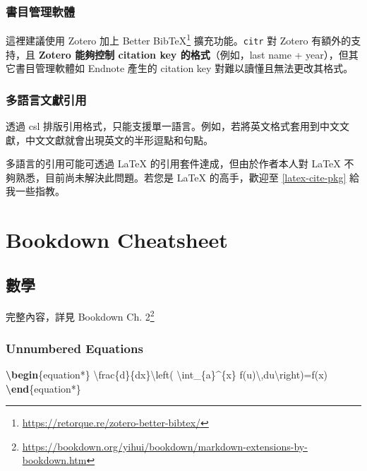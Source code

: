 \documentclass[oneside]{book}
\newenvironment{Shaded}{\begin{snugshade}}{\end{snugshade}}
\newcommand{\KeywordTok}[1]{\textcolor[rgb]{0.13,0.29,0.53}{\textbf{#1}}}
\newcommand{\SpecialCharTok}[1]{\textcolor[rgb]{0.00,0.00,0.00}{#1}}
\newcommand{\SpecialStringTok}[1]{\textcolor[rgb]{0.31,0.60,0.02}{#1}}
\newcommand{\ExtensionTok}[1]{#1}
\newcommand{\NormalTok}[1]{#1}
\renewcommand{\href}[2]{#2\footnote{\url{#1}}}
\theoremstyle{definition}
\theoremstyle{definition}
\theoremstyle{definition}
\theoremstyle{remark}
\begin{document}
\subsection{書目管理軟體}\label{ref-manager}

這裡建議使用 Zotero 加上
\href{https://retorque.re/zotero-better-bibtex/}{Better BibTeX}
擴充功能。\texttt{citr} 對 Zotero 有額外的支持，且 \textbf{Zotero
能夠控制 citation key 的格式}（例如，last name +
year），但其它書目管理軟體如 Endnote 產生的 citation key
對難以讀懂且無法更改其格式。

\subsection{多語言文獻引用}\label{multi-lang-cite}

透過 csl
排版引用格式，只能支援單一語言。例如，若將英文格式套用到中文文獻，中文文獻就會出現英文的半形逗點和句點。

多語言的引用可能可透過 LaTeX 的引用套件達成，但由於作者本人對 LaTeX
不夠熟悉，目前尚未解決此問題。若您是 LaTeX 的高手，歡迎至
\ref{latex-cite-pkg} 給我一些指教。

\chapter{Bookdown Cheatsheet}\label{bookdown-cheatsheet}

\section{數學}\label{math}

完整內容，詳見
\href{https://bookdown.org/yihui/bookdown/markdown-extensions-by-bookdown.htm}{Bookdown
Ch. 2}

\subsection{Unnumbered Equations}\label{unnumbered-equations}

\begin{Shaded}
\begin{Highlighting}[]
\KeywordTok{\textbackslash{}begin}\NormalTok{\{}\ExtensionTok{equation*}\NormalTok{\}}\SpecialStringTok{ }
\SpecialCharTok{\textbackslash{}frac}\SpecialStringTok{\{d\}\{dx\}}\SpecialCharTok{\textbackslash{}left}\SpecialStringTok{( }\SpecialCharTok{\textbackslash{}int}\SpecialStringTok{_\{a\}^\{x\} f(u)}\SpecialCharTok{\textbackslash{},}\SpecialStringTok{du}\SpecialCharTok{\textbackslash{}right}\SpecialStringTok{)=f(x)}
\KeywordTok{\textbackslash{}end}\NormalTok{\{}\ExtensionTok{equation*}\NormalTok{\} }
\end{Highlighting}
\end{Shaded}
\end{document}
